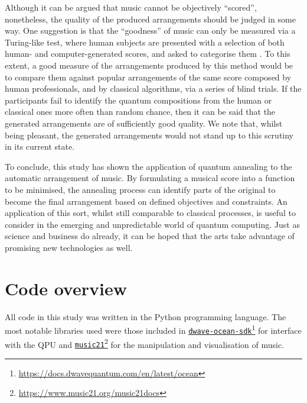 \documentclass[12pt]{article}
\theoremstyle{definition}
\begin{document}
Although it can be argued that music cannot be objectively ``scored'', nonetheless, the quality of the produced arrangements should be judged in some way. One suggestion is that the ``goodness'' of music can only be measured via a Turing-like test, where human subjects are presented with a selection of both human- and computer-generated scores, and asked to categorise them \cite{pearce_towards_2001}. To this extent, a good measure of the arrangements produced by this method would be to compare them against popular arrangements of the same score composed by human professionals, and by classical algorithms, via a series of blind trials. If the participants fail to identify the quantum compositions from the human or classical ones more often than random chance, then it can be said that the generated arrangements are of sufficiently good quality. We note that, whilst being pleasant, the generated arrangements would not stand up to this scrutiny in its current state.

To conclude, this study has shown the application of quantum annealing to the automatic arrangement of music. By formulating a musical score into a function to be minimised, the annealing process can identify parts of the original to become the final arrangement based on defined objectives and constraints. An application of this sort, whilst still comparable to classical processes, is useful to consider in the emerging and unpredictable world of quantum computing. Just as science and business do already, it can be hoped that the arts take advantage of promising new technologies as well.

\begin{singlespace*}
    \printbibliography[heading=bibintoc]
\end{singlespace*}

\clearpage
\appendix
{}

\section{Code overview}
\label{app:code}

All code in this study was written in the Python programming language. The most notable libraries used were those included in \href{https://docs.dwavequantum.com/en/latest/ocean}{\texttt{dwave-ocean-sdk}}\footnote{\url{https://docs.dwavequantum.com/en/latest/ocean}} for interface with the QPU and \href{https://www.music21.org/music21docs}{\texttt{music21}}\footnote{\url{https://www.music21.org/music21docs}} for the manipulation and visualisation of music.
\end{document}
